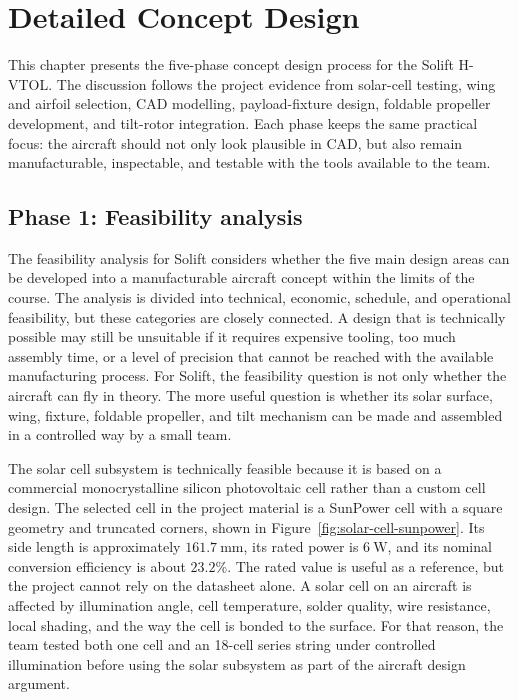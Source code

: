 \chapter{Detailed Concept Design}
\label{sec:detailed-concept-design}

This chapter presents the five-phase concept design process for the Solift H-VTOL. The discussion follows the project evidence from solar-cell testing, wing and airfoil selection, CAD modelling, payload-fixture design, foldable propeller development, and tilt-rotor integration. Each phase keeps the same practical focus: the aircraft should not only look plausible in CAD, but also remain manufacturable, inspectable, and testable with the tools available to the team.

\section{Phase 1: Feasibility analysis}
\label{subsec:phase1-feasibility}

The feasibility analysis for Solift considers whether the five main design areas can be developed into a manufacturable aircraft concept within the limits of the course. The analysis is divided into technical, economic, schedule, and operational feasibility, but these categories are closely connected. A design that is technically possible may still be unsuitable if it requires expensive tooling, too much assembly time, or a level of precision that cannot be reached with the available manufacturing process. For Solift, the feasibility question is not only whether the aircraft can fly in theory. The more useful question is whether its solar surface, wing, fixture, foldable propeller, and tilt mechanism can be made and assembled in a controlled way by a small team.

The solar cell subsystem is technically feasible because it is based on a commercial monocrystalline silicon photovoltaic cell rather than a custom cell design. The selected cell in the project material is a SunPower cell with a square geometry and truncated corners, shown in Figure~\ref{fig:solar-cell-sunpower}. Its side length is approximately \(161.7~\mathrm{mm}\), its rated power is \(6~\mathrm{W}\), and its nominal conversion efficiency is about \(23.2\%\). The rated value is useful as a reference, but the project cannot rely on the datasheet alone. A solar cell on an aircraft is affected by illumination angle, cell temperature, solder quality, wire resistance, local shading, and the way the cell is bonded to the surface. For that reason, the team tested both one cell and an 18-cell series string under controlled illumination before using the solar subsystem as part of the aircraft design argument.

